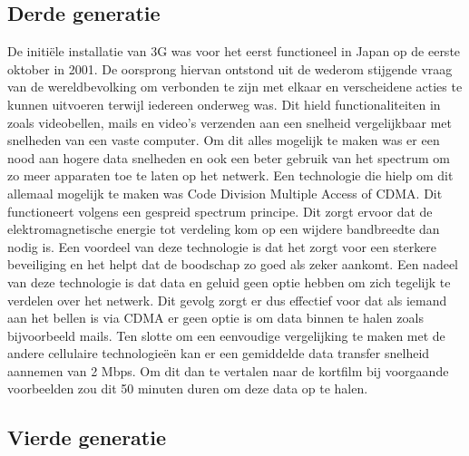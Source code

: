 \subsection{Derde generatie}

De initiële installatie van 3G was voor het eerst functioneel in Japan op de eerste oktober in 2001. De oorsprong hiervan ontstond uit de wederom stijgende vraag van de wereldbevolking om verbonden te zijn met elkaar en verscheidene acties te kunnen uitvoeren terwijl iedereen onderweg was. Dit hield functionaliteiten in zoals videobellen, mails en video's verzenden aan een snelheid vergelijkbaar met snelheden van een vaste computer. Om dit alles mogelijk te maken was er een nood aan hogere data snelheden en ook een beter gebruik van het spectrum om zo meer apparaten toe te laten op het netwerk. \autocite{Dulcey2020} Een technologie die hielp om dit allemaal mogelijk te maken was Code Division Multiple Access of CDMA. Dit functioneert volgens een gespreid spectrum principe. Dit zorgt ervoor dat de elektromagnetische energie tot verdeling kom op een wijdere bandbreedte dan nodig is. Een voordeel van deze technologie is dat het zorgt voor een sterkere beveiliging en het helpt dat de boodschap zo goed als zeker aankomt. Een nadeel van deze technologie is dat data en geluid geen optie hebben om zich tegelijk te verdelen over het netwerk. Dit gevolg zorgt er dus effectief voor dat als iemand aan het bellen is via CDMA er geen optie is om data binnen te halen zoals bijvoorbeeld mails. \autocite{Fendelman2021} Ten slotte om een eenvoudige vergelijking te maken met de andere cellulaire technologieën kan er een gemiddelde data transfer snelheid aannemen van 2 Mbps.\autocite{Galazzo2020} Om dit dan te vertalen naar de kortfilm bij voorgaande voorbeelden zou dit 50 minuten duren om deze data op te halen. \autocite{Wooding2024}

\subsection{Vierde generatie}

